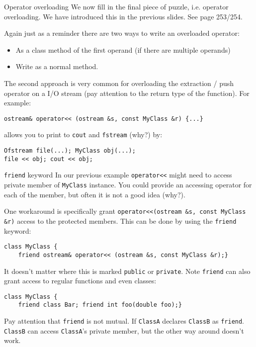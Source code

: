 \begin{frame}[fragile]{Operator overloading} 
We now fill in the final piece of puzzle, i.e. operator overloading. We have introduced this in the previous slides. See page 253/254. 

Again just as a reminder there are two ways to write an overloaded operator:
\begin{itemize}
	\item As a class method of the first operand (if there are multiple operands)
	\item Write as a normal method.
\end{itemize}

The second approach is very common for overloading the extraction / push operator on a I/O stream (pay attention to the return type of the function).  For example:

\begin{verbatim}
ostream& operator<< (ostream &s, const MyClass &r) {...}
\end{verbatim}

allows you to print to \texttt{cout} and \texttt{fstream} (why?) by:
\begin{verbatim}
Ofstream file(...); MyClass obj(...);
file << obj; cout << obj;
\end{verbatim} 

\end{frame}

\begin{frame}[fragile]{\texttt{friend} keyword}
\small
In our previous example \texttt{operator<<} might need to access private member of \texttt{MyClass} instance. You could provide an accessing operator for each of the member, but often it is not a good idea (why?). 

One workaround is specifically grant \texttt{operator<<(ostream \&s, const MyClass \&r)} access to the protected members. This can be done by using the \texttt{friend} keyword:

\begin{verbatim}
class MyClass {
    friend ostream& operator<< (ostream &s, const MyClass &r);}
\end{verbatim}

It doesn't matter where this is marked \texttt{public} or \texttt{private}. Note \texttt{friend} can also grant access to regular functions and even classes:

\begin{verbatim}
class MyClass { 
    friend class Bar; friend int foo(double foo);}
\end{verbatim}

Pay attention that \texttt{friend} is not mutual. If \texttt{ClassA} declares \texttt{ClassB} as \texttt{friend}. \texttt{ClassB} can access \texttt{ClassA}'s private member, but the other way around doesn't work. 
\end{frame}